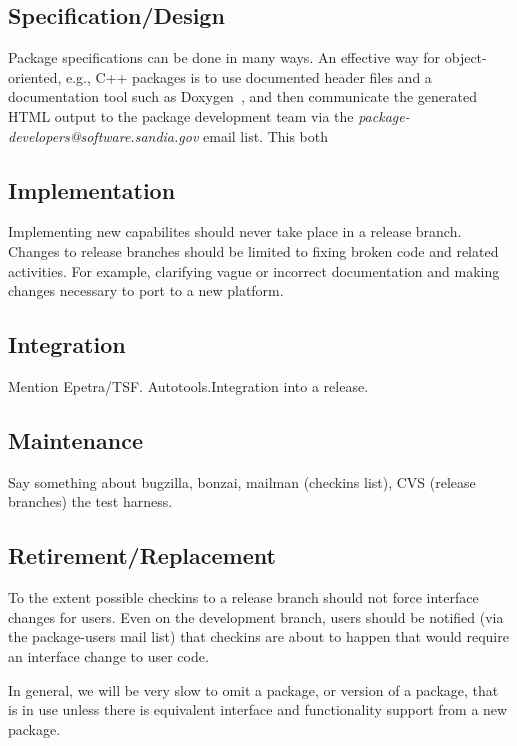 \documentclass[12pt,relax]{SANDreport}
\begin{document}
\subsection{Specification/Design}
Package specifications can be done in many ways.  An effective way for 
object-oriented, e.g., C++ packages is to use documented header files and a 
documentation tool such as Doxygen~\cite{doxyen}, and then communicate the 
generated HTML output to the package development team via the 
{\it package-developers@software.sandia.gov} email list.  This both

\subsection{Implementation}
Implementing new capabilites should never take place in a release branch.  
Changes to release branches should be limited to fixing broken code and 
related activities.  For example, clarifying vague or incorrect documentation 
and making changes necessary to port to a new platform.

\subsection{Integration}
Mention Epetra/TSF. Autotools.Integration into a release.

\subsection{Maintenance}
Say something about bugzilla, bonzai, mailman (checkins list), CVS (release 
branches) the test harness.

\subsection{Retirement/Replacement}
To the extent possible checkins to a release branch should not force interface 
changes for users.  Even on the development branch, users should be notified 
(via the package-users mail list) that checkins are about to happen that would 
require an interface change to user code.

In general, we will be very slow to omit a package, or version of a package, 
that is in use unless there is equivalent interface and functionality support 
from a new package.
\end{document}
